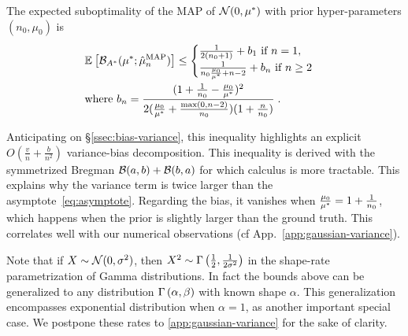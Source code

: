 \documentclass[twoside]{article}
\newcommand*{\expect}[2][]{\ensuremath{\mathbb{E}_{#1} \left[ #2 \right] }} %
\newcommand{\logpart}{A}
\newcommand{\bregmanconj}{\cB_{\logpart^*}}
\newcommand{\m}{\mu}
\begin{document}
\begin{theorem}
\label{thm:varianceMAP}
The expected suboptimality of the MAP of $\cN(0,\m^*)$ with prior hyper-parameters $(n_0,\m_0)$ is
 \begin{align}
	& \expect{\bregmanconj( \m^*; \hat \m_n^\mathrm{MAP})}
	\leq \begin{cases}
		\inv{2(n_0+1)}  +  b_1 \ \text{if}\ n=1,\\
		\frac{1}{n_0 \frac{\m_0}{\m^*} +n-2} + b_n \ \text{if}\ n\geq 2
	\end{cases}
	\label{eq:MAP_rate}\\
	& \text{where }b_n = \frac{(1 + \inv{n_0} - \frac{\m_0}{\m^*})^2}{2 (\frac{\m_0}{\m^*}+\frac{\max(0,n-2)}{n_0})(1 + \frac{n}{n_0} )} \; . \nonumber
\end{align}
\end{theorem}
Anticipating on \S\ref{ssec:bias-variance}, this inequality highlights an explicit $O(\frac{v}{n} + \frac{b}{n^2})$ variance-bias decomposition.
This inequality is derived with the symmetrized Bregman ${\mathcal B}(a,b) + {\mathcal B}(b,a)$ for which calculus is more tractable.
This explains why the variance term is twice larger than the asymptote~\eqref{eq:asymptote}.
Regarding the bias, it vanishes when $\frac{\m_0}{\m^*} =1 + \inv{n_0} $, which happens when the prior is slightly larger than the ground truth.
This correlates well with our numerical observations (cf App.~\ref{app:gaussian-variance}).

Note that if $X\sim {\mathcal N}(0,\sigma^2)$, then $X^2 \sim \Gamma\left(\frac{1}{2}, \frac{1}{2\sigma^2}\right)$ in the shape-rate parametrization of Gamma distributions. In fact the bounds above can be generalized to any distribution $\Gamma\left(\alpha, \beta\right)$ with known shape $\alpha$.
This generalization encompasses exponential distribution when $\alpha=1$, as another important special case.
 We postpone these rates to \cref{app:gaussian-variance} for the sake of clarity.
\end{document}
